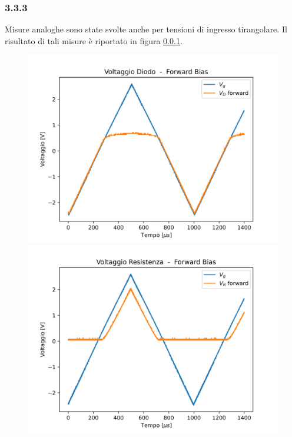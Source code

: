 \subsubsection{3.3.3}
Misure analoghe sono state svolte anche per tensioni di ingresso tirangolare. Il risultato di tali misure è riportato in figura \ref{}.
\begin{figure}
    \centering
    \begin{minipage}{0.475\textwidth}
        \includegraphics[]{Diodo 3.2.3/Triang_V_D_Forward.png}
    \end{minipage}
    \hfill
    \begin{minipage}{0.475\textwidth}
        \includegraphics[]{Diodo 3.2.3/Triang_V_R_Forward.png}

\end{minipage}
\end{figure}
